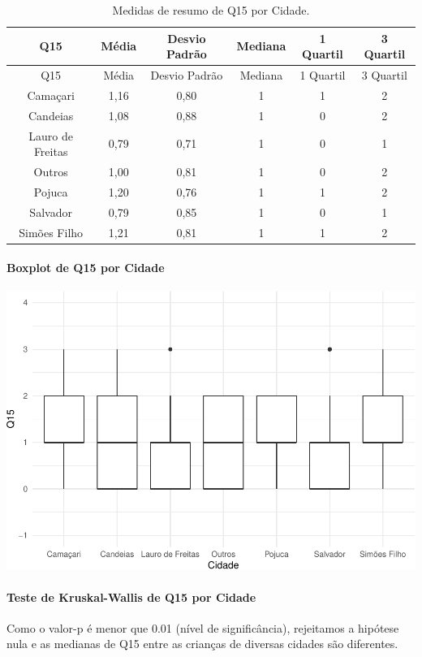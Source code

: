 \documentclass[]{article}
\let\oldparagraph\paragraph
\renewcommand{\paragraph}[1]{\oldparagraph{#1}\mbox{}}
\begin{document}
\begin{longtable}[]{@{}cccccc@{}}
\caption{\label{tab:unnamed-chunk-75}Medidas de resumo de Q15 por Cidade.}\tabularnewline
\toprule
Q15 & Média & Desvio Padrão & Mediana & 1 Quartil & 3 Quartil\tabularnewline
\midrule
\endfirsthead
\toprule
Q15 & Média & Desvio Padrão & Mediana & 1 Quartil & 3 Quartil\tabularnewline
\midrule
\endhead
Camaçari & 1,16 & 0,80 & 1 & 1 & 2\tabularnewline
Candeias & 1,08 & 0,88 & 1 & 0 & 2\tabularnewline
Lauro de Freitas & 0,79 & 0,71 & 1 & 0 & 1\tabularnewline
Outros & 1,00 & 0,81 & 1 & 0 & 2\tabularnewline
Pojuca & 1,20 & 0,76 & 1 & 1 & 2\tabularnewline
Salvador & 0,79 & 0,85 & 1 & 0 & 1\tabularnewline
Simões Filho & 1,21 & 0,81 & 1 & 1 & 2\tabularnewline
\bottomrule
\end{longtable}

\hypertarget{boxplot-de-q15-por-cidade}{%
\paragraph{Boxplot de Q15 por Cidade}\label{boxplot-de-q15-por-cidade}}

\begin{center}\includegraphics[width=0.75\linewidth]{relatorio_covid19_files/figure-latex/unnamed-chunk-76-1} \end{center}

\hypertarget{teste-de-kruskal-wallis-de-q15-por-cidade}{%
\paragraph{Teste de Kruskal-Wallis de Q15 por Cidade}\label{teste-de-kruskal-wallis-de-q15-por-cidade}}

Como o valor-p é menor que 0.01 (nível de significância), rejeitamos a hipótese nula e as medianas de Q15 entre as crianças de diversas cidades são diferentes.
\end{document}
